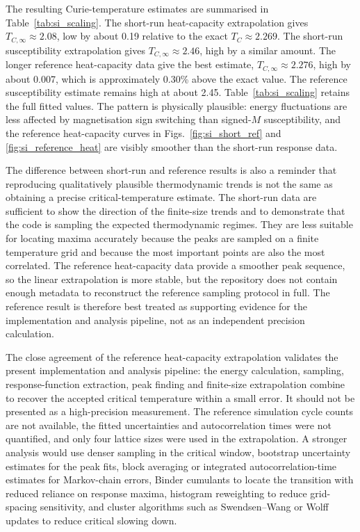 \documentclass[twoside,twocolumn,9pt]{extarticle}
\begin{document}
The resulting Curie-temperature estimates are summarised in Table~\ref{tab:si_scaling}. The short-run heat-capacity extrapolation gives \(T_{C,\infty}\approx2.08\), low by about 0.19 relative to the exact \(T_C\approx2.269\). The short-run susceptibility extrapolation gives \(T_{C,\infty}\approx2.46\), high by a similar amount. The longer reference heat-capacity data give the best estimate, \(T_{C,\infty}\approx2.276\), high by about 0.007, which is approximately 0.30\% above the exact value. The reference susceptibility estimate remains high at about 2.45. Table~\ref{tab:si_scaling} retains the full fitted values. The pattern is physically plausible: energy fluctuations are less affected by magnetisation sign switching than signed-\(M\) susceptibility, and the reference heat-capacity curves in Figs.~\ref{fig:si_short_ref} and \ref{fig:si_reference_heat} are visibly smoother than the short-run response data.

The difference between short-run and reference results is also a reminder that reproducing qualitatively plausible thermodynamic trends is not the same as obtaining a precise critical-temperature estimate. The short-run data are sufficient to show the direction of the finite-size trends and to demonstrate that the code is sampling the expected thermodynamic regimes. They are less suitable for locating maxima accurately because the peaks are sampled on a finite temperature grid and because the most important points are also the most correlated. The reference heat-capacity data provide a smoother peak sequence, so the linear extrapolation is more stable, but the repository does not contain enough metadata to reconstruct the reference sampling protocol in full. The reference result is therefore best treated as supporting evidence for the implementation and analysis pipeline, not as an independent precision calculation.

The close agreement of the reference heat-capacity extrapolation validates the present implementation and analysis pipeline: the energy calculation, sampling, response-function extraction, peak finding and finite-size extrapolation combine to recover the accepted critical temperature within a small error. It should not be presented as a high-precision measurement. The reference simulation cycle counts are not available, the fitted uncertainties and autocorrelation times were not quantified, and only four lattice sizes were used in the extrapolation. A stronger analysis would use denser sampling in the critical window, bootstrap uncertainty estimates for the peak fits, block averaging or integrated autocorrelation-time estimates for Markov-chain errors,\cite{sokal1989,landau2021} Binder cumulants to locate the transition with reduced reliance on response maxima,\cite{binder1981} histogram reweighting to reduce grid-spacing sensitivity,\cite{ferrenberg1988} and cluster algorithms such as Swendsen--Wang or Wolff updates to reduce critical slowing down.\cite{swendsen1987,wolff1989}
\end{document}
